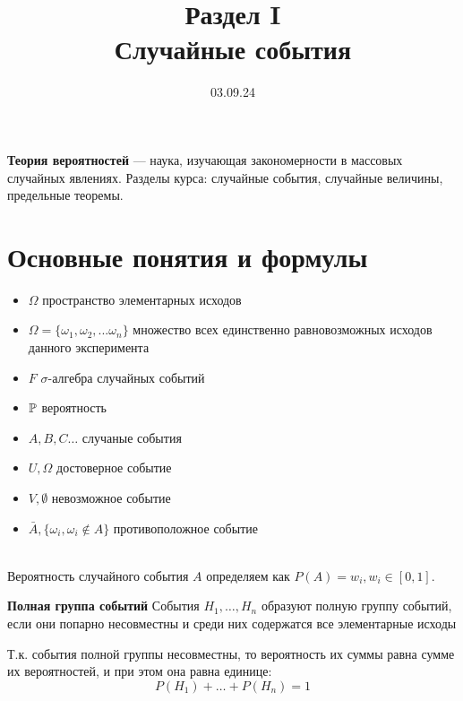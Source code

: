 

\title{Раздел I \\
       Случайные события}
\date{03.09.24}


    \maketitle
    
    \textbf{Теория вероятностей} — наука, изучающая закономерности 
    в массовых случайных явлениях. Разделы курса: случайные события, случайные 
    величины, предельные теоремы.

    \section{Основные понятия и формулы}

    \begin{itemize}
        \item \(\Omega\) пространство элементарных исходов 
        \item \(\Omega = \{\omega_1, \omega_2, ... \omega_n\}\)
        множество всех единственно равновозможных исходов данного эксперимента
        \item \(F\) \(\sigma\)-алгебра случайных событий
        \item \(\mathbb{P}\) вероятность
        \\
        \item \(A, B, C\dots\) случаные события
        \item \(U, \Omega\) достоверное событие
        \item \(V, \emptyset\) невозможное событие
        \item \(\bar A, \{\omega_i, \omega_i \notin A\}\) противоположное событие
    \end{itemize}
    \\
    Вероятность случайного события \(A\) определяем как \(P(A) = w_i, w_i \in [0,1]\).
    
    \begin{opr}
        \textbf{Полная группа событий}
        События \(H_{1}, \dots , H_{n}\) образуют полную группу событий, 
        если они попарно несовместны и среди них содержатся все элементарные исходы

        \begin{remark}
            Т.к. события полной группы несовместны, то вероятность их суммы равна 
            сумме их вероятностей, и при этом она равна единице:
            \begin{equation}
                P(H_{1}) + \dots + P(H_{n}) = 1
            \end{equation}
        \end{remark}
    \end{opr}


